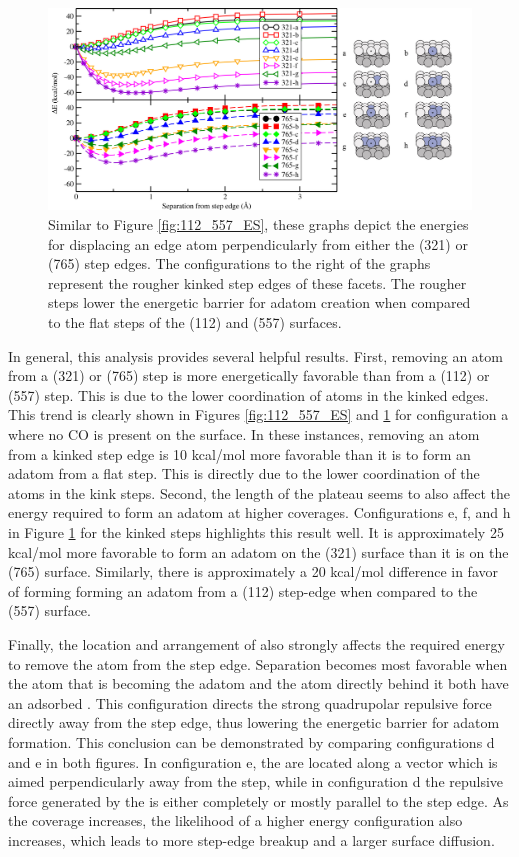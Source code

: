 \begin{landscape}
\begin{figure}[p!]
  \centering
  \includegraphics[width=0.75\linewidth]{../figures/chap4/321_765_EnergySeparation.pdf}
  \caption{Similar to Figure \ref{fig:112_557_ES}, these graphs depict the
energies for displacing an edge atom perpendicularly from either the (321) or
(765) step edges. The configurations to the right of the graphs represent the
rougher kinked step edges of these facets. The rougher steps lower the 
energetic barrier for adatom creation when compared to the flat steps of the
(112) and (557) surfaces.}
\label{fig:321_765_ES}
\end{figure}
\end{landscape}

In general, this analysis provides several helpful results. First, removing an
atom from a (321) or (765) step is more energetically favorable than from a
(112) or (557) step. This is due to the lower coordination of atoms in
the kinked edges. This trend is clearly shown in Figures \ref{fig:112_557_ES}
and \ref{fig:321_765_ES} for configuration a where no CO is present on the
surface. In these instances, removing an atom from a kinked step edge is 10
kcal/mol more favorable than it is to form an adatom from a flat step. This is
directly due to the lower coordination of the atoms in the kink steps.
Second, the length of the plateau seems to also affect the energy required to form
an adatom at higher coverages.  Configurations e, f, and h in Figure
\ref{fig:321_765_ES} for the kinked steps highlights this result well. It is
approximately 25 kcal/mol more favorable to form an adatom on the (321) surface
than it is on the (765) surface. Similarly, there is approximately a 20
kcal/mol difference in favor of forming  forming an adatom from a (112) step-edge when
compared to the (557) surface.

Finally, the location and arrangement of  also strongly affects the
required energy to remove the atom from the step edge. Separation becomes most
favorable when the atom that is becoming the adatom and the atom directly
behind it both have an adsorbed . This configuration directs the strong
quadrupolar repulsive force directly away from the step edge, thus lowering the
energetic barrier for adatom formation.  This conclusion can be demonstrated by
comparing configurations d and e in both figures. In configuration e, the
 are located along a vector which is aimed perpendicularly away from the
step, while in configuration d the repulsive force generated by the  is
either completely or mostly parallel to the step edge. As the coverage
increases, the likelihood of a higher energy configuration also increases,
which leads to more step-edge breakup and a larger surface diffusion.


